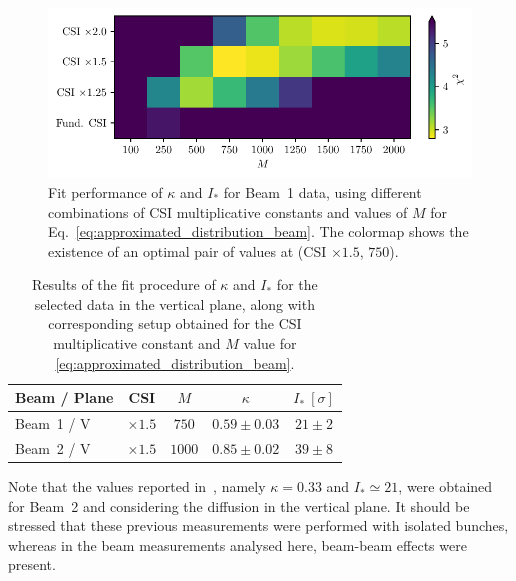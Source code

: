 \begin{figure}
    \centering
    \includegraphics[trim={0 2.5mm 0 1.5mm}, clip, width=0.98\columnwidth]{5_Diffusion_measurement_LHC/figs/fourth.pdf}
    \caption{Fit performance of $\kappa$ and $I_\ast$ for Beam~1 data, using different combinations of CSI multiplicative constants and values of $M$ for Eq.~\eqref{eq:approximated_distribution_beam}. The colormap shows the existence of an optimal pair of values at (CSI $\times 1.5$, $750$).}
    \label{fig:fourth}
\end{figure}
%
\begin{table}[htb]
    \centering
    \caption{Results of the fit procedure of $\kappa$ and $I_\ast$ for the selected data in the vertical plane, along with corresponding setup obtained for the CSI multiplicative constant and $M$ value for \eqref{eq:approximated_distribution_beam}.}
    \begin{tabular}{lcccc}
        \toprule
        Beam / Plane & CSI & $M$ & $\kappa$ & $I_\ast\ [\sigma]$ \\
        \midrule
        Beam~1 / V & $\times1.5$ & $750$ & $0.59\pm0.03$ & $21\pm2$ \\
        Beam~2 / V & $\times1.5$ & $1000$ & $0.85\pm0.02$ & $39\pm8$ \\
        \bottomrule
    \end{tabular}
    \label{tab:fit_results}
\end{table}
%

Note that the values reported in~\cite{bazzani2020diffusion}, namely $\kappa=0.33 $ and $I_\ast \simeq 21$, were obtained for Beam~2 and considering the diffusion in the vertical plane. It should be stressed that these previous measurements were performed with isolated bunches, whereas in the beam measurements analysed here, beam-beam effects were present.

